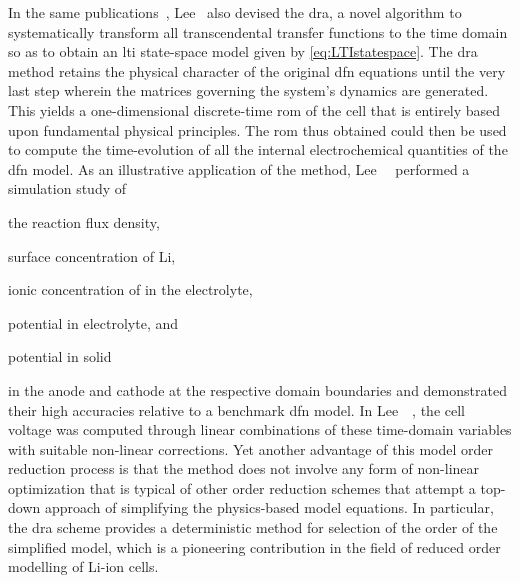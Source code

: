 In the  same publications~\cite{Lee2012a,Lee2012}, Lee~\etal{} also  devised the
\gls{dra},  a novel  algorithm  to systematically  transform all  transcendental
transfer functions to  the time domain so as to  obtain an \gls{lti} state-space
model  given  by \cref{eq:LTIstatespace}.  The   \gls{dra}  method  retains  the
physical character of the original \gls{dfn}  equations until the very last step
wherein the matrices governing the  system's dynamics are generated. This yields
a one-dimensional  discrete-time \gls{rom}  of the cell  that is  entirely based
upon fundamental  physical principles.  The \gls{rom}  thus obtained  could then
be  used to  compute  the  time-evolution of  all  the internal  electrochemical
quantities of the \gls{dfn} model. As an illustrative application of the method,
Lee~\etal~\cite{Lee2012a} performed a simulation study of
\begin{enumerate*}[label=\itshape\alph*\upshape)]
    \item the reaction flux density,
    \item surface concentration of Li,
    \item ionic concentration of  in the electrolyte,
    \item potential in electrolyte, and
    \item potential in solid
\end{enumerate*}
in   the  anode   and  cathode   at   the  respective   domain  boundaries   and
demonstrated  their high  accuracies relative  to a  benchmark \gls{dfn}  model.
In  Lee~\etal~\cite{Lee2012,Lee2012a}, the  cell  voltage  was computed  through
linear  combinations of  these  time-domain variables  with suitable  non-linear
corrections. Yet another advantage of this model order reduction process is that
the method does not involve any  form of non-linear optimization that is typical
of other order reduction schemes that attempt a top-down approach of simplifying
the physics-based model equations. In  particular, the \gls{dra} scheme provides
a deterministic method for selection of the order of the simplified model, which
is a pioneering  contribution in the field of reduced  order modelling of Li-ion
cells.


